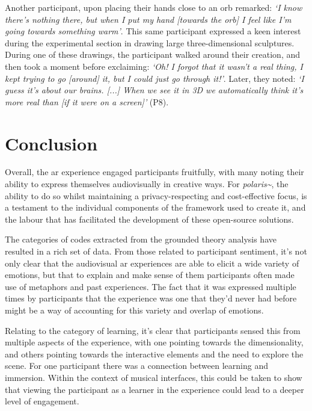Another participant, upon placing their hands close to an orb remarked: \textit{`I know there's nothing there, but when I put my hand [towards the orb] I feel like I'm going towards something warm'}. This same participant expressed a keen interest during the experimental section in drawing large three-dimensional sculptures. During one of these drawings, the participant walked around their creation, and then took a moment before exclaiming: \textit{`Oh! I forgot that it wasn't a real thing, I kept trying to go [around] it, but I could just go through it!'}. Later, they noted: \textit{`I guess it's about our brains. [...] When we see it in 3D we automatically think it's more real than [if it were on a screen]'} (P8).

\section{Conclusion}\label{sec: polaris-conclusion}
Overall, the \gls{ar} experience engaged participants fruitfully, with many noting their ability to express themselves audiovisually in creative ways. For \textit{polaris\textasciitilde{}}, the ability to do so whilst maintaining a privacy-respecting and cost-effective focus, is a testament to the individual components of the framework used to create it, and the labour that has facilitated the development of these open-source solutions.

The categories of codes extracted from the grounded theory analysis have resulted in a rich set of data. From those related to participant sentiment, it's not only clear that the audiovisual \gls{ar} experiences are able to elicit a wide variety of emotions, but that to explain and make sense of them participants often made use of metaphors and past experiences. The fact that it was expressed multiple times by participants that the experience was one that they'd never had before might be a way of accounting for this variety and overlap of emotions.

Relating to the category of learning, it's clear that participants sensed this from multiple aspects of the experience, with one pointing towards the dimensionality, and others pointing towards the interactive elements and the need to explore the scene. For one participant there was a connection between learning and immersion. Within the context of musical interfaces, this could be taken to show that viewing the participant as a learner in the experience could lead to a deeper level of engagement.

